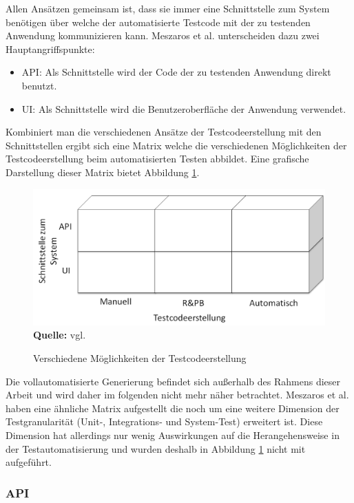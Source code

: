 Allen Ansätzen gemeinsam ist, dass sie immer eine Schnittstelle zum System benötigen über welche der automatisierte Testcode mit der zu testenden Anwendung kommunizieren kann.
Meszaros et al. unterscheiden dazu zwei Hauptangriffspunkte:
\begin{itemize}
\item API: Als Schnittstelle wird der Code der zu testenden Anwendung direkt benutzt.
\item 
UI: Als Schnittstelle wird die Benutzeroberfläche der Anwendung verwendet.
\end{itemize}

Kombiniert man die verschiedenen Ansätze der Testcodeerstellung mit den Schnittstellen ergibt sich eine Matrix welche die verschiedenen Möglichkeiten der Testcodeerstellung beim automatisierten Testen abbildet. Eine grafische Darstellung dieser Matrix bietet Abbildung \ref{fig:bereicheTestcodeerstellung}.


\begin{figure}[htb]
  \centering  
  \includegraphics[scale=0.7]{img/bereicheTestcodeerstellung.png}\\
  \footnotesize\sffamily\textbf{Quelle:} vgl. \cite{fewster_software_1999}
  \caption{Verschiedene Möglichkeiten der Testcodeerstellung}
  \label{fig:bereicheTestcodeerstellung}
\end{figure}

Die vollautomatisierte Generierung befindet sich außerhalb des Rahmens dieser Arbeit und wird daher im folgenden nicht mehr näher betrachtet.
Meszaros et al. haben eine ähnliche Matrix aufgestellt die noch um eine weitere Dimension der Testgranularität (Unit-, Integrations- und System-Test) erweitert ist. Diese Dimension hat allerdings nur wenig Auswirkungen auf die Herangehensweise in der Testautomatisierung und wurden deshalb in Abbildung \ref{fig:bereicheTestcodeerstellung} nicht mit aufgeführt.

\subsubsection{API}
\label{subsubsec:API}

